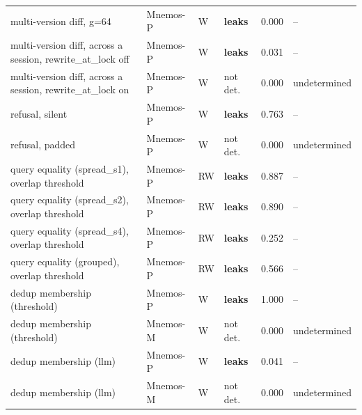 \begin{table}[t]
\begin{tabular}{llllrl}
multi-version diff, g=64 & Mnemos-P & W & \textbf{leaks} & 0.000 & -- \\
multi-version diff, across a session, rewrite\_at\_lock off & Mnemos-P & W & \textbf{leaks} & 0.031 & -- \\
multi-version diff, across a session, rewrite\_at\_lock on & Mnemos-P & W & not det. & 0.000 & undetermined \\
refusal, silent & Mnemos-P & W & \textbf{leaks} & 0.763 & -- \\
refusal, padded & Mnemos-P & W & not det. & 0.000 & undetermined \\
query equality (spread\_s1), overlap threshold & Mnemos-P & RW & \textbf{leaks} & 0.887 & -- \\
query equality (spread\_s2), overlap threshold & Mnemos-P & RW & \textbf{leaks} & 0.890 & -- \\
query equality (spread\_s4), overlap threshold & Mnemos-P & RW & \textbf{leaks} & 0.252 & -- \\
query equality (grouped), overlap threshold & Mnemos-P & RW & \textbf{leaks} & 0.566 & -- \\
dedup membership (threshold) & Mnemos-P & W & \textbf{leaks} & 1.000 & -- \\
dedup membership (threshold) & Mnemos-M & W & not det. & 0.000 & undetermined \\
dedup membership (llm) & Mnemos-P & W & \textbf{leaks} & 0.041 & -- \\
dedup membership (llm) & Mnemos-M & W & not det. & 0.000 & undetermined \\
\bottomrule
\end{tabular}
\end{table}
